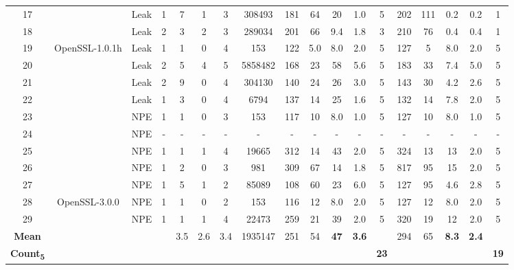 \begin{table*}[t!]
\begin{tabular}{c|c|c|c|c|c|c|c|c|c|c|c|c|c|c|c|c|c}
17 &                                  & Leak & 1 & 7 & 1 & 3 & 308493 & 181 & 64 & 20 & 1.0 & 5 & 202 & 111 & 0.2 & 0.2 & 1 \\ 
18 &                                  & Leak & 2 & 3 & 2 & 3 & 289034 & 201 & 66 & 9.4 & 1.8 & 3 & 210 & 76 & 0.4 & 0.4 & 1 \\ \hline
19 & \multirow{9}{*}{OpenSSL-1.0.1h}  & Leak & 1 & 1 & 0 & 4 & 153 & 122 & 5.0 & 8.0 & 2.0 & 5 & 127 & 5 & 8.0 & 2.0 & 5 \\ 
20 &                                  & Leak & 2 & 5 & 4 & 5 & 5858482 & 168 & 23 & 58 & 5.6 & 5 & 183 & 33 & 7.4 & 5.0 & 5\\
21 &                                  & Leak & 2 & 9 & 0 & 4 & 304130 & 140 & 24 & 26 & 3.0 & 5 & 143 & 30 & 4.2 & 2.6 & 5\\ 
22 &                                  & Leak & 1 & 3 & 0 & 4 & 6794 & 137 & 14 & 25 & 1.6 & 5 & 132 & 14 & 7.8 & 2.0 & 5\\ 
23 &                                  & NPE & 1 & 1 & 0 & 3 & 153 & 117 & 10 & 8.0 & 1.0 & 5 & 127 & 10 & 8.0 & 1.0 & 5 \\ 
24 &                                  & NPE & - & - & - & - & - & - & - & - & - & - & - & - & - & - & - \\
25 &                                  & NPE & 1 & 1 & 1 & 4 & 19665 & 312 & 14 & 43 & 2.0 & 5 & 324 & 13 & 13 & 2.0 & 5 \\
26 &                                  & NPE & 1 & 2 & 0 & 3 & 981 & 309 & 67 & 14 & 1.8 & 5 & 817 & 95 & 15 & 2.0 & 5 \\
27 &                                  & NPE & 1 & 5 & 1 & 2 & 85089 & 108 & 60 & 23 & 6.0 & 5 & 127 & 95 & 4.6 & 2.8 & 5 \\ \hline
28 & \multirow{2}{*}{OpenSSL-3.0.0}   & NPE & 1 & 1 & 0 & 2 & 153 & 116 & 12 & 8.0 & 2.0 & 5 & 127 & 12 & 8.0 & 2.0 & 5  \\
29 &                                  & NPE & 1 & 1 & 1 & 4 & 22473 & 259 & 21 & 39 & 2.0 & 5 & 320 & 19 & 12 & 2.0 & 5 \\ \hline\hline

\textbf{Mean} &  &  &  & 3.5 & 2.6 & 3.4 & 1935147 & 251 & 54 & \textbf{47} & \textbf{3.6} &  & 294 & 65 & \textbf{8.3} & \textbf{2.4} &  \\
\textbf{Count\textsubscript{5}} &  &  &  &  &  &  &  &  & & & & \textbf{23}  & & & &  & \textbf{19}  \\ \hline

\end{tabular}
\end{table*}
